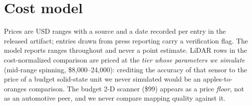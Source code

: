 \documentclass[journal]{IEEEtran}
\begin{document}
\section{Cost model}

Prices are USD ranges with a source and a date recorded per entry in the released artifact;
entries drawn from press reporting carry a verification flag. The model reports ranges
throughout and never a point estimate. LiDAR rows in the cost-normalized comparison are
priced at the \emph{tier whose parameters we simulate} (mid-range spinning,
\$8{,}000--24{,}000): crediting the accuracy of that sensor to the price of a budget
solid-state unit we never simulated would be an apples-to-oranges comparison. The budget 2-D
scanner (\$99) appears as a price \emph{floor}, not as an automotive peer, and we never
compare mapping quality against it.
\end{document}
